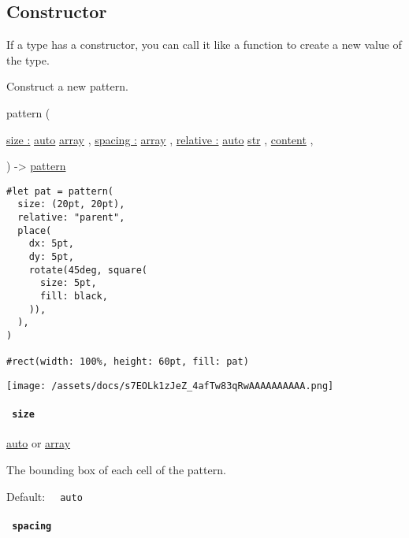 \subsection{\texorpdfstring{Constructor
{}}{Constructor }}\label{constructor}

\label{constructor-constructor-tooltip}
If a type has a constructor, you can call it like a function to create a
new value of the type.

Construct a new pattern.

{ pattern } (

{ \hyperref[constructor-parameters-size]{size :}
\href{/docs/reference/foundations/auto/}{auto}
\href{/docs/reference/foundations/array/}{array} , } {
\hyperref[constructor-parameters-spacing]{spacing :}
\href{/docs/reference/foundations/array/}{array} , } {
\hyperref[constructor-parameters-relative]{relative :}
\href{/docs/reference/foundations/auto/}{auto}
\href{/docs/reference/foundations/str/}{str} , } {
\href{/docs/reference/foundations/content/}{content} , }

) -\textgreater{} \href{/docs/reference/visualize/pattern/}{pattern}

\begin{verbatim}
#let pat = pattern(
  size: (20pt, 20pt),
  relative: "parent",
  place(
    dx: 5pt,
    dy: 5pt,
    rotate(45deg, square(
      size: 5pt,
      fill: black,
    )),
  ),
)

#rect(width: 100%, height: 60pt, fill: pat)
\end{verbatim}

\texttt{[image: /assets/docs/s7EOLk1zJeZ\_4afTw83qRwAAAAAAAAAA.png]}

\paragraph{\texorpdfstring{\texttt{\ size\ }}{ size }}\label{constructor-size}

\href{/docs/reference/foundations/auto/}{auto} {or}
\href{/docs/reference/foundations/array/}{array}

The bounding box of each cell of the pattern.

Default: \texttt{\ }{\texttt{\ auto\ }}\texttt{\ }

\paragraph{\texorpdfstring{\texttt{\ spacing\ }}{ spacing }}\label{constructor-spacing}

